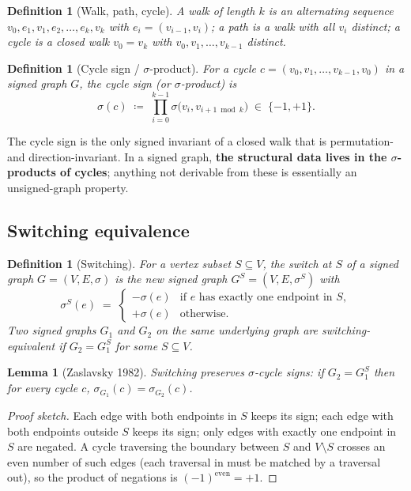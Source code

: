 \documentclass[11pt,a4paper]{article}
\newtheorem{lemma}[theorem]{Lemma}
\newtheorem{definition}[theorem]{Definition}
\theoremstyle{remark}
\begin{document}
\begin{definition}[Walk, path, cycle]
A \emph{walk} of length $k$ is an alternating sequence
$v_0, e_1, v_1, e_2, \dots, e_k, v_k$ with $e_i = (v_{i-1}, v_i)$;
a \emph{path} is a walk with all $v_i$ distinct; a \emph{cycle}
is a closed walk $v_0 = v_k$ with $v_0, v_1, \dots, v_{k-1}$
distinct.
\end{definition}

\begin{definition}[Cycle sign / $\sigma$-product]\label{def:cycle-sign}
For a cycle $c = (v_0, v_1, \dots, v_{k-1}, v_0)$ in a signed
graph $G$, the \emph{cycle sign} (or \emph{$\sigma$-product}) is
\[
  \sigma(c) \;\coloneqq\; \prod_{i=0}^{k-1} \sigma\bigl(v_i, v_{i+1 \bmod k}\bigr) \;\in\; \{-1, +1\}.
\]
\end{definition}

The cycle sign is the only signed invariant of a closed walk that
is permutation- and direction-invariant. In a signed graph,
\textbf{the structural data lives in the $\sigma$-products of
cycles}; anything not derivable from these is essentially an
unsigned-graph property.

\subsection{Switching equivalence}

\begin{definition}[Switching]
For a vertex subset $S \subseteq V$, the \emph{switch at $S$} of a
signed graph $G = (V, E, \sigma)$ is the new signed graph
$G^S = (V, E, \sigma^S)$ with
\[
  \sigma^S(e) \;=\;
  \begin{cases}
    -\sigma(e) & \text{if } e \text{ has exactly one endpoint in } S,\\
    +\sigma(e) & \text{otherwise.}
  \end{cases}
\]
Two signed graphs $G_1$ and $G_2$ on the same underlying graph are
\emph{switching-equivalent} if $G_2 = G_1^S$ for some
$S \subseteq V$.
\end{definition}

\begin{lemma}[Zaslavsky 1982]\label{lem:switching-invariant}
Switching preserves $\sigma$-cycle signs: if $G_2 = G_1^S$ then
for every cycle $c$, $\sigma_{G_1}(c) = \sigma_{G_2}(c)$.
\end{lemma}

\begin{proof}[Proof sketch]
Each edge with both endpoints in $S$ keeps its sign; each edge
with both endpoints outside $S$ keeps its sign; only edges with
exactly one endpoint in $S$ are negated. A cycle traversing the
boundary between $S$ and $V \setminus S$ crosses an even number
of such edges (each traversal in must be matched by a traversal
out), so the product of negations is $(-1)^{\text{even}} = +1$.
\end{proof}
\end{document}
